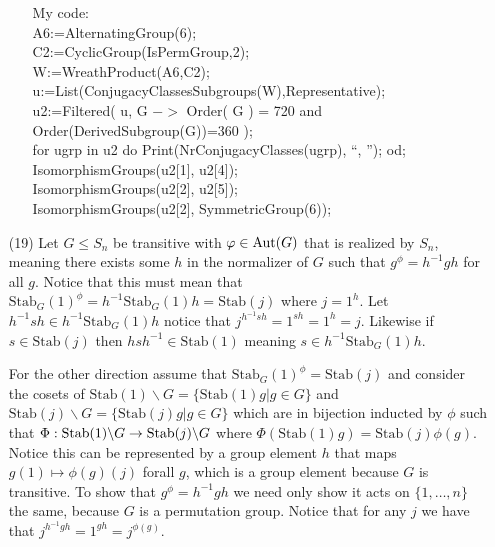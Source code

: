 \documentclass[12pt]{amsart}
\begin{document}
\begin{itemize}
\begin{enumerate}[label= (\alph*)]
   My code:\\

A6:=AlternatingGroup(6);\\
C2:=CyclicGroup(IsPermGroup,2);\\
W:=WreathProduct(A6,C2);\\
u:=List(ConjugacyClassesSubgroups(W),Representative);\\
u2:=Filtered( u, G $->$ Order( G ) = 720 and Order(DerivedSubgroup(G))=360 );\\
for ugrp in u2 do Print(NrConjugacyClasses(ugrp), ``, ''); od;\\
IsomorphismGroups(u2[1], u2[4]);\\
IsomorphismGroups(u2[2], u2[5]);\\
IsomorphismGroups(u2[2], SymmetricGroup(6));\\

   \end{enumerate}


   \item[(19)] Let $G\leq S_n$ be transitive with $\varphi\in\operatorname{\mathrm{Aut}}(G)$ that is realized by $S_n$, 
   meaning there exists some $h$ in the normalizer of $G$ such that $g^\phi=h^{-1}gh$ for all $g$.
   Notice that this must mean that $\text{Stab}_G(1)^\phi=h^{-1}\text{Stab}_G(1)h=\text{Stab}(j)$ where $j=1^h$.
   Let $h^{-1}sh\in h^{-1}\text{Stab}_G(1)h$ notice that $j^{h^{-1}sh}=1^{sh}=1^{h}=j$.
   Likewise if $s\in \text{Stab}(j)$ then $hsh^{-1}\in\text{Stab}(1)$ meaning $s\in h^{-1}\text{Stab}_G(1)h$.

   For the other direction assume that $\text{Stab}_G(1)^\phi=\text{Stab}(j)$ and consider the cosets of 
   $\text{Stab}(1)\backslash G=\{\text{Stab}(1) g | g\in G\}$ and 
   $\text{Stab}(j)\backslash G=\{\text{Stab}(j) g | g\in G\}$ which are in bijection inducted by $\phi$
   such that $\Phi: \text{Stab}(1)\backslash G\rightarrow \text{Stab}(j)\backslash G$ where 
   $\Phi(\text{Stab}(1) g)=\text{Stab}(j) \phi(g)$. Notice this can be represented by a group element 
   $h$ that maps $g(1)\mapsto \phi(g)(j)$ forall $g$, which is a group element because $G$ is transitive.
   To show that $g^\phi=h^{-1}gh$ we need only show it acts on $\{1,\dots, n\}$ the same, because $G$ is a permutation group.
   Notice that for any $j$ we have that $j^{h^{-1}gh}=1^{gh}=j^{\phi(g)}$.


\end{itemize}
\end{document}

